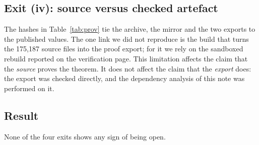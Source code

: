 \subsection{Exit (iv): source versus checked artefact}

The hashes in Table~\ref{tab:prov} tie the archive, the mirror and the two exports to the published values.
The one link we did not reproduce is the build that turns the 175,187 source files into the proof export; for it we rely on the sandboxed rebuild reported on the verification page.
This limitation affects the claim that the \emph{source} proves the theorem. It does not affect the claim that the \emph{export} does: the export was checked directly, and the dependency analysis of this note was performed on it.

\subsection{Result}

None of the four exits shows any sign of being open.

